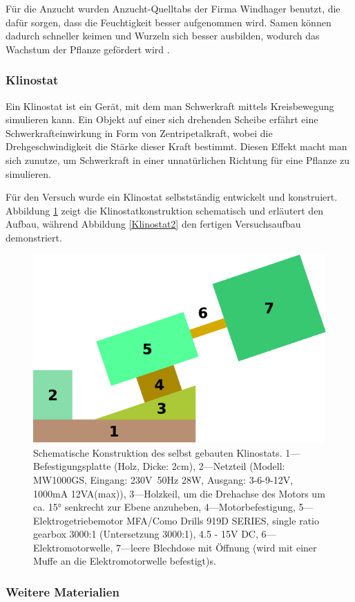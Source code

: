 \documentclass[
11pt, 
ngerman,
listof=totocnumbered,
oneside,
bibliography=totocnumbered,
abstracton
]{scrreprt}
\begin{document}
Für die Anzucht wurden Anzucht-Quelltabs der Firma Windhager benutzt, die dafür sorgen, dass die Feuchtigkeit besser aufgenommen wird. Samen können dadurch schneller keimen und Wurzeln sich besser ausbilden, wodurch das Wachstum der Pflanze gefördert wird \parencite{Windhager}. 

\subsubsection{Klinostat}

Ein Klinostat ist ein Gerät, mit dem man Schwerkraft mittels Kreisbewegung simulieren kann. Ein Objekt auf einer sich drehenden Scheibe erfährt eine Schwerkrafteinwirkung in Form von Zentripetalkraft, wobei die Drehgeschwindigkeit die Stärke dieser Kraft bestimmt. Diesen Effekt macht man sich zunutze, um Schwerkraft in einer unnatürlichen Richtung für eine Pflanze zu simulieren. 

Für den Versuch wurde ein Klinostat selbstständig entwickelt und konstruiert. Abbildung \ref{Klinstat1} zeigt die Klinostatkonstruktion schematisch und erläutert den Aufbau, während Abbildung \ref{Klinostat2} den fertigen Versuchsaufbau demonstriert. 

\begin{figure}[H]
	\centering 
	\includegraphics[width = 0.5\linewidth]{images/drawing-1.pdf}
	\caption{Schematische Konstruktion des selbst gebauten Klinostats. 1---Befestigungsplatte (Holz, Dicke: 2cm), 2---Netzteil (Modell: MW1000GS, Eingang: 230V~50Hz 28W, Ausgang: 3-6-9-12V, 1000mA 12VA(max)), 3---Holzkeil, um die Drehachse des Motors um ca. \ang{15} senkrecht zur Ebene anzuheben, 4---Motorbefestigung, 5---Elektrogetriebemotor MFA/Como Drills 919D SERIES, single ratio gearbox 3000:1 (Untersetzung 3000:1), 4.5 - 15V DC, 6---Elektromotorwelle, 7---leere Blechdose mit Öffnung (wird mit einer Muffe an die Elektromotorwelle befestigt)s\label{Klinstat1}.}
\end{figure} 

\subsubsection{Weitere Materialien}
\end{document}
